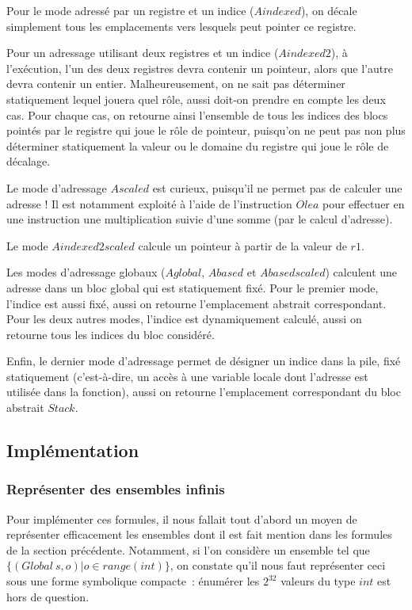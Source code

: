 \documentclass{article}
\newcommand\mi{\mathit}
\begin{document}
Pour le mode adressé par un registre et un indice ($Aindexed$), on
décale simplement tous les emplacements vers lesquels peut pointer ce registre.

Pour un adressage utilisant deux registres et un indice
($Aindexed2$), à l'exécution, l'un des deux registres devra contenir
un pointeur, alors que l'autre devra contenir un entier.  Malheureusement, on
ne sait pas déterminer statiquement lequel jouera quel rôle, aussi doit-on
prendre en compte les deux cas. Pour chaque cas, on retourne ainsi l'ensemble
de tous les indices des blocs pointés par le registre qui joue le rôle de
pointeur, puisqu'on ne peut pas non plus déterminer statiquement la valeur ou
le domaine du registre qui joue le rôle de décalage.

Le mode d'adressage $Ascaled$ est curieux, puisqu'il ne permet pas de
calculer une adresse ! Il est notamment exploité à l'aide de l'instruction
$Olea$ pour effectuer en une instruction une multiplication suivie
d'une somme (par le calcul d'adresse).

Le mode $Aindexed2scaled$ calcule un pointeur à partir de la valeur
de $r1$.

Les modes d'adressage globaux ($Aglobal$, $Abased$ et
$Abasedscaled$) calculent une adresse dans un bloc global qui est
statiquement fixé. Pour le premier mode, l'indice est aussi fixé, aussi on
retourne l'emplacement abstrait correspondant. Pour les deux autres modes,
l'indice est dynamiquement calculé, aussi on retourne tous les indices du bloc
considéré.

Enfin, le dernier mode d'adressage permet de désigner un indice dans la pile,
fixé statiquement (c'est-à-dire, un accès à une variable locale dont l'adresse
est utilisée dans la fonction), aussi on retourne l'emplacement correspondant
du bloc abstrait $Stack$.

\subsection{Implémentation}

\subsubsection{Représenter des ensembles infinis}

Pour implémenter ces formules, il nous fallait tout d'abord un moyen de
représenter efficacement les ensembles dont il est fait mention dans les
formules de la section précédente. Notamment, si l'on considère un ensemble tel
que $\{(\mi{Global}\ s, o) | o \in \mi{range(int)}\}$, on constate qu'il nous
faut représenter ceci sous une forme symbolique compacte~: énumérer les
$2^{32}$ valeurs du type $int$ est hors de question.
\end{document}
